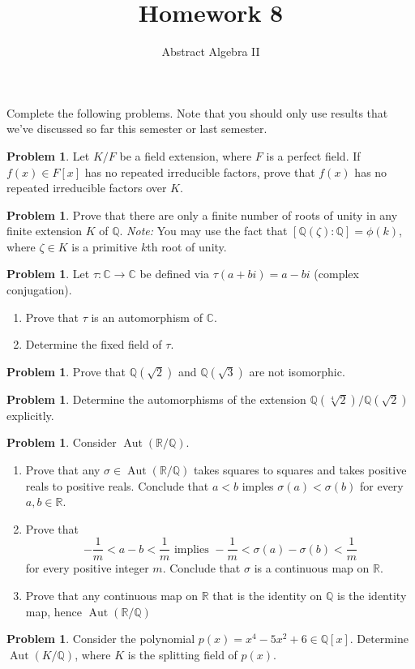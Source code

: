 \documentclass[11pt]{scrartcl}
\theoremstyle{definition}
\newtheorem{problem}[theorem]{Problem}
\DeclareMathOperator{\Aut}{Aut}
\begin{document}
\title{Homework 8}
\subtitle{Abstract Algebra II}
\date{}

\maketitle
\thispagestyle{fancy}

Complete the following problems. Note that you should only use results that we've discussed so far this semester or last semester.

\begin{problem}
Let $K/F$ be a field extension, where $F$ is a perfect field. If $f(x) \in F[x]$ has no repeated irreducible factors, prove that $f(x)$ has no repeated irreducible factors over $K$.	
\end{problem}

\begin{problem}
Prove that there are only a finite number of roots of unity in any finite extension $K$ of $\mathbb{Q}$. \emph{Note:} You may use the fact that $[\mathbb{Q}(\zeta):\mathbb{Q}] = \phi(k)$, where $\zeta \in K$ is a primitive $k$th root of unity.
\end{problem}

\begin{problem}
Let $\tau:\mathbb{C}\to \mathbb{C}$ be defined via $\tau(a+bi)=a-bi$ (complex conjugation).
\begin{enumerate}[label=\rm{(\alph*)}]
\item Prove that $\tau$ is an automorphism of $\mathbb{C}$.
\item Determine the fixed field of $\tau$.
\end{enumerate}
\end{problem}

\begin{problem}
Prove that $\mathbb{Q}(\sqrt{2})$ and $\mathbb{Q}(\sqrt{3})$ are not isomorphic.	
\end{problem}

\begin{problem}
Determine the automorphisms of the extension $\mathbb{Q}(\sqrt[4]{2})/\mathbb{Q}(\sqrt{2})$ explicitly.
\end{problem}

\begin{problem}
Consider $\Aut(\mathbb{R}/\mathbb{Q})$.
\begin{enumerate}[label=\rm{(\alph*)}]
\item Prove that any $\sigma\in \Aut(\mathbb{R}/\mathbb{Q})$ takes squares to squares and takes positive reals to positive reals.  Conclude that $a<b$ imples $\sigma(a)<\sigma(b)$ for every $a,b\in\mathbb{R}$.
\item Prove that
\[
-\frac{1}{m}<a-b<\frac{1}{m}\text{ implies } -\frac{1}{m}<\sigma(a)-\sigma(b)<\frac{1}{m}
\]
for every positive integer $m$. Conclude that $\sigma$ is a continuous map on $\mathbb{R}$.
\item Prove that any continuous map on $\mathbb{R}$ that is the identity on $\mathbb{Q}$ is the identity map, hence $\Aut(\mathbb{R}/\mathbb{Q})$
\end{enumerate}
\end{problem}

\begin{problem}
Consider the polynomial $p(x)=x^4-5x^2+6\in\mathbb{Q}[x]$.  Determine $\Aut(K/\mathbb{Q})$, where $K$ is the splitting field of $p(x)$.
\end{problem}
\end{document}
